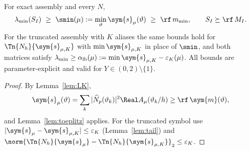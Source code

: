 \begin{theorem}\label{thm:spectral}
For exact assembly and every $N$,
\begin{equation}
 \lambda_{\min}(S_I)\ \ge\ \smin(\mu):=\min_{\vartheta}\sym{s}_\mu(\vartheta)
 \ \ge\ \rf\,m_{\min},
 \qquad S_I\succeq \rf\,M_I .
 \label{eq:spectral}
\end{equation}
For the truncated assembly with $K$ aliases the same bounds hold for
$\Tn{N_h}{\sym{s}_{\mu,K}}$ with $\min\sym{s}_{\mu,K}$ in place of $\smin$, and both
matrices satisfy $\lambda_{\min}\ge\alpha_{\rm lb}(\mu):=\min\sym{s}_{\mu,K}-\varepsilon_K(\mu)$.
All bounds are parameter-explicit and valid for $Y\in(0,2)\setminus\{1\}$.
\end{theorem}
\begin{proof}
By Lemma~\ref{lem:LK},
\[
\sym{s}_\mu(\vartheta)=\sum_k|\widehat N_p(\vartheta_k)|^2\Real A_\mu(\vartheta_k/h)\ge \rf\,\sym{m}(\vartheta),
\]
and Lemma~\ref{lem:toeplitz} applies.  For the truncated symbol use
$|\sym{s}_\mu-\sym{s}_{\mu,K}|\le\varepsilon_K$ (Lemma~\ref{lem:tail}) and
$\norm{\Tn{N_h}{\sym{s}_\mu}-\Tn{N_h}{\sym{s}_{\mu,K}}}_2\le\varepsilon_K$.
\end{proof}
